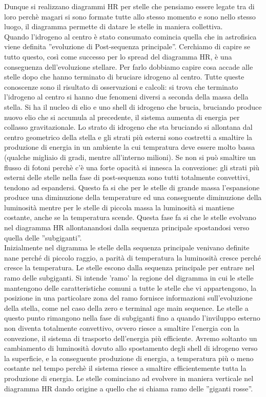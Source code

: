 \documentclass[a4paper,11pt]{article}
\begin{document}
    Dunque si realizzano diagrammi HR per stelle che pensiamo essere legate tra di loro perchè magari si sono formate tutte allo stesso momento e sono nello stesso luogo, il diagramma permette di datare le stelle in maniera collettiva.\\
    Quando l'idrogeno al centro è stato consumato comincia quella che in astrofisica viene definita ''evoluzione di Post-sequenza principale''. Cerchiamo di capire se tutto questo, così come successo per lo spread del diagramma HR, è una conseguenza dell'evoluzione stellare. Per farlo dobbiamo capire cosa accade alle stelle dopo che hanno terminato di bruciare idrogeno al centro. Tutte queste conoscenze sono il risultato di osservazioni e calcoli: si trova che terminato l'idrogeno al centro si hanno due fenomeni diversi a seconda della massa della stella. Si ha il nucleo di elio e uno shell di idrogeno che brucia, bruciando produce nuovo elio che si accumula al precedente, il sistema aumenta di energia per collasso gravitazionale. Lo strato di idrogeno che sta bruciando si allontana dal centro geometrico della stella e gli strati più esterni sono costretti a smaltire la produzione di energia in un ambiente la cui tempratura deve essere molto bassa (qualche migliaio di gradi, mentre all'interno milioni). Se non si può smaltire un flusso di fotoni perchè c'è una forte opacità si innesca la convezione: gli strati più esterni delle stelle nella fase di post-sequenza sono tutti totalmente convettivi, tendono ad espandersi. Questo fa si che per le stelle di grande massa l'espansione produce una diminuzione della temperature ed una conseguente diminuzione della luminosità mentre per le stelle di piccola massa la luminosità si mantiene costante, anche se la temperatura scende. Questa fase fa si che le stelle evolvano nel diagramma HR allontanandosi dalla sequenza principale spostandosi verso quella delle ''subgiganti''.\\
    Inizialmente nel digramma le stelle della sequenza principale venivano definite nane perché di piccolo raggio, a parità di temperatura la luminosità cresce perché cresce la temperatura. Le stelle escono dalla sequenza principale per entrare nel ramo delle subgiganti. Si intende 'ramo' la regione del digramma in cui le stelle mantengono delle caratteristiche comuni a tutte le stelle che vi appartengono, la posizione in una particolare zona del ramo fornisce informazioni sull'evoluzione della stella, come nel caso della zero e terminal age main sequence. Le stelle a questo punto rimangono nella fase di subgiganti fino a quando l'inviluppo esterno non diventa totalmente convettivo, ovvero riesce a smaltire l'energia con la convezione, il sistema di trasporto dell'energia più efficiente. Avremo soltanto un cambiamento di luminosità dovuto allo spostamento degli shell di idrogeno verso la superficie, e la conseguente produzione di energia, a temperatura più o meno costante nel tempo perchè il sistema riesce a smaltire efficientemente tutta la produzione di energia. Le stelle cominciano ad evolvere in maniera verticale nel diagramma HR dando origine a quello che si chiama ramo delle ''giganti rosse''. 
\end{document}
